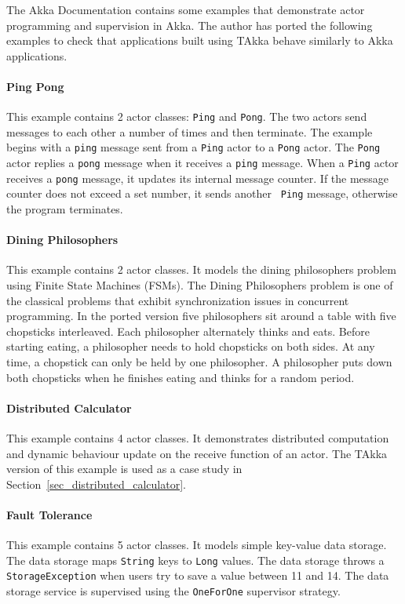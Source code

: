 The Akka Documentation \citep{akka_doc} contains some examples that demonstrate 
actor programming and supervision in Akka.  The author has ported the 
following examples to check that applications built using TAkka behave similarly 
to Akka applications.

\paragraph{Ping Pong} This example contains 2 actor classes: {\tt Ping} and 
{\tt Pong}.  The two actors send messages to each other a number of 
times and then terminate.  The example begins with a {\tt ping} message sent 
from a {\tt Ping} actor to a {\tt Pong} actor.  The {\tt Pong} actor replies a 
{\tt pong} message when it receives a {\tt ping} message.  When a {\tt Ping} 
actor receives a {\tt pong} message, it updates its internal message counter.  
If the message counter does not exceed a set number, it sends another {\tt 
Ping} message, otherwise the program terminates.



\paragraph{Dining Philosophers} This example contains 2 actor classes.  It 
models the dining philosophers problem \citep{wiki:philosophers} using 
Finite State Machines (FSMs).   The Dining Philosophers problem is one of the 
classical problems that exhibit 
synchronization issues in concurrent programming.  In the ported version five 
philosophers sit around a table with five chopsticks interleaved.  Each 
philosopher alternately thinks and eats.  Before starting eating, a philosopher 
needs to hold chopsticks on both sides.  At any time, a chopstick can only be 
held by one philosopher.  A philosopher puts down both chopsticks when he 
finishes eating and thinks for a random period.  




\paragraph{Distributed Calculator} This example contains 4 actor classes.  
It demonstrates distributed computation and dynamic behaviour update on the 
receive function of an actor.  The TAkka version of this example is used as a 
case study in Section~\ref{sec_distributed_calculator}.

\paragraph{Fault Tolerance} This example contains 5 actor classes.  It models 
simple key-value data storage.  The data storage maps {\tt String} keys to 
{\tt Long} values.  The data storage throws a {\tt StorageException} when 
users try to save a value between 11 and 14.  The data storage service is 
supervised using the {\tt OneForOne} supervisor strategy.


